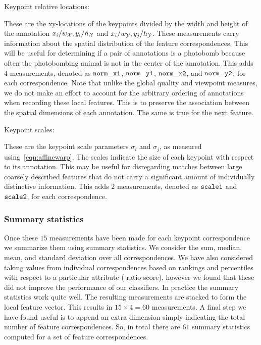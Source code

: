 \begin{itemln}
    \item Keypoint relative locations:

        These are the xy-locations of the keypoints divided by the width and height of the annotation  %
        $x_i / w_{\mathcal{X}}, y_i / h_{\mathcal{X}}$ and $x_i / w_{\mathcal{Y}}, y_j / h_{\mathcal{Y}}$.
        These measurements carry information about the spatial distribution of the feature correspondences.
        This will be useful for determining if a pair of annotations is a photobomb because often the
          photobombing animal is not in the center of the annotation.
        This adds $4$ measurements, denoted as $\tt{norm\_x1}$, $\tt{norm\_y1}$, $\tt{norm\_x2}$, and
          $\tt{norm\_y2}$, for each correspondence.
        Note that unlike the global quality and viewpoint measures, we do not make an effort to account for the
          arbitrary ordering of annotations when recording these local features.
        This is to preserve the association between the spatial dimensions of each annotation.
        The same is true for the next feature.

    \item Keypoint scales:

        These are the keypoint scale parameters $\sigma_i$ and $\sigma_j$, as measured
          using~\cref{eqn:affinewarp}.
        The scales indicate the size of each keypoint with respect to its annotation.
        This may be useful for disregarding matches between large coarsely described features that do not carry a
          significant amount of individually distinctive information.
        This adds $2$ measurements, denoted as $\tt{scale1}$ and $\tt{scale2}$, for each correspondence.

\end{itemln}

\subsubsection{Summary statistics}
Once these $15$ measurements have been made for each keypoint correspondence we summarize them using summary
  statistics.
We consider the sum, median, mean, and standard deviation over all correspondences.
We have also considered taking values from individual correspondences based on rankings and percentiles with
  respect to a particular attribute (\eg{} ratio score), however we found that these did not improve the
  performance of our classifiers.
In practice the summary statistics work quite well.
The resulting measurements are stacked to form the local feature vector.
This results in $15 \times 4 = 60$ measurements.
A final step we have found useful is to append an extra dimension simply indicating the total number of feature
  correspondences.
So, in total there are $61$ summary statistics computed for a set of feature correspondences.

